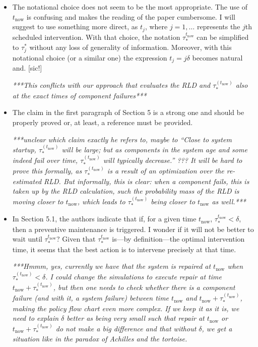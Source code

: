 \documentclass[authoryear]{elsarticle}
\def\tnow{t_\text{now}}
\newcommand{\tausnow}{\tau_*^{(\tnow)}}
\begin{document}
\begin{itemize}
\item The notational choice does not seem to be the most appropriate. The use of $\tnow$ is confusing and makes the reading of the paper cumbersome. I will suggest to use something more direct, as $t_j$, where $j=1,\ldots$ represents the $j$th scheduled intervention. With that choice, the notation $\tau^{\tnow}_*$ can be simplified to $\tau^*_j$ without any loss of generality of information. Moreover, with this notational choice (or a similar one) the expression $t_j=j \delta$ becomes natural and. [sic!]

\smallskip

\emph{***This conflicts with our approach that evaluates the RLD and $\tausnow$ also at the exact times of component failures***}

\item The claim in the first paragraph of Section 5 is a strong one and should be properly proved or, at least, a reference must be provided.

\smallskip

\emph{***unclear which claim exactly he refers to, maybe to
``Close to system startup, $\tausnow$ will be large;
but as components in the system age and some indeed fail over time, $\tausnow$ will typically decrease.'' ???
It will be hard to prove this formally, as $\tausnow$ is a result of an optimization over the re-estimated RLD.
But informally, this is clear: when a component fails, this is taken up by the RLD calculation,
such the probability mass of the RLD is moving closer to $\tnow$,
which leads to $\tausnow$ being closer to $\tnow$ as well.***}

\item In Section 5.1, the authors indicate that if, for a given time $\tnow$, $\tau_*^{\tnow}<\delta$, then a preventive maintenance is triggered. I wonder if it will not be better to wait until $\tau_*^{\tnow}$? Given that $\tau_*^{\tnow}$ is---by definition---the optimal intervention time, it seems that the best action is to intervene precisely at that time.

\smallskip

\emph{***Hmmm, yes, currently we have that the system is repaired at $\tnow$ when $\tausnow < \delta$.
I could change the simulations to execute repair at time $\tnow + \tausnow$,
but then one needs to check whether there is a component failure (and with it, a system failure)
between time $\tnow$ and $\tnow + \tausnow$, making the policy flow chart even more complex.
If we keep it as it is, we need to explain $\delta$ better as being very small such that repair at $\tnow$ or $\tnow + \tausnow$
do not make a big difference and that without $\delta$, we get a situation like in the paradox of Achilles and the tortoise.}


\end{itemize}
\end{document}
